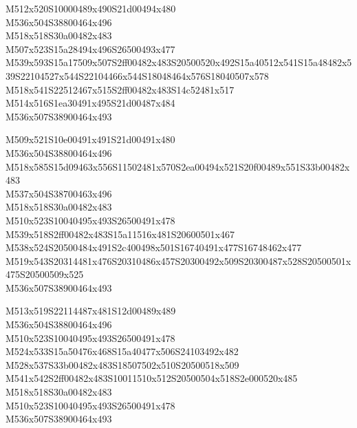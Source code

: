 \documentclass{article}
\begin{document}
\begin{multicols}{5}
\begin{center}

M512x520S10000489x490S21d00494x480 %
\\M536x504S38800464x496 %
\\M518x518S30a00482x483 %
\\M507x523S15a28494x496S26500493x477 %
\\M539x593S15a17509x507S2ff00482x483S20500520x492S15a40512x541S15a48482x539S22104527x544S22104466x544S18048464x576S18040507x578 %
\\M518x541S22512467x515S2ff00482x483S14c52481x517 %
\\M514x516S1ea30491x495S21d00487x484 %
\\M536x507S38900464x493 %
\vfil
\columnbreak

M509x521S10e00491x491S21d00491x480 %
\\M536x504S38800464x496 %
\\M518x585S15d09463x556S11502481x570S2ea00494x521S20f00489x551S33b00482x483 %
\\M537x504S38700463x496 %
\\M518x518S30a00482x483 %
\\M510x523S10040495x493S26500491x478 %
\\M539x518S2ff00482x483S15a11516x481S20600501x467 %
\\M538x524S20500484x491S2c400498x501S16740491x477S16748462x477 %
\\M519x543S20314481x476S20310486x457S20300492x509S20300487x528S20500501x475S20500509x525 %
\\M536x507S38900464x493 %
\vfil
\columnbreak

M513x519S22114487x481S12d00489x489 %
\\M536x504S38800464x496 %
\\M510x523S10040495x493S26500491x478 %
\\M524x533S15a50476x468S15a40477x506S24103492x482 %
\\M528x537S33b00482x483S18507502x510S20500518x509 %
\\M541x542S2ff00482x483S10011510x512S20500504x518S2e000520x485 %
\\M518x518S30a00482x483 %
\\M510x523S10040495x493S26500491x478 %
\\M536x507S38900464x493 %
\vfil
\columnbreak


\end{center}
\end{multicols}
\end{document}
